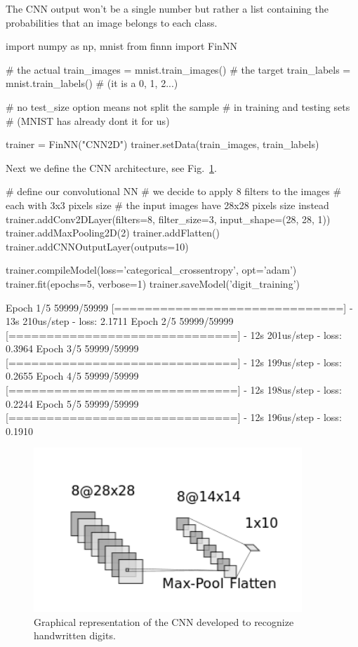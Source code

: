 The CNN output won't be a single number but rather a list containing the probabilities that an image belongs to each class.

\begin{ipython}
import numpy as np, mnist
from finnn import FinNN

# the actual
train_images = mnist.train_images()
# the target
train_labels = mnist.train_labels() # (it is a 0, 1, 2...)

# no test_size option means not split the sample
# in training and testing sets
# (MNIST has already dont it for us)

trainer = FinNN("CNN2D")
trainer.setData(train_images, train_labels)
\end{ipython}
\noindent
Next we define the CNN architecture, see Fig.~\ref{fig:cnn2d}.

\begin{ipython}
# define our convolutional NN
# we decide to apply 8 filters to the images
# each with 3x3 pixels size
# the input images have 28x28 pixels size instead
trainer.addConv2DLayer(filters=8, filter_size=3, input_shape=(28, 28, 1))
trainer.addMaxPooling2D(2)
trainer.addFlatten()
trainer.addCNNOutputLayer(outputs=10)

trainer.compileModel(loss='categorical_crossentropy', opt='adam')
trainer.fit(epochs=5, verbose=1)
trainer.saveModel('digit_training')
\end{ipython}
\begin{ioutput}
Epoch 1/5
59999/59999 [==============================] - 13s 210us/step - loss: 2.1711
Epoch 2/5
59999/59999 [==============================] - 12s 201us/step - loss: 0.3964
Epoch 3/5
59999/59999 [==============================] - 12s 199us/step - loss: 0.2655
Epoch 4/5
59999/59999 [==============================] - 12s 198us/step - loss: 0.2244
Epoch 5/5
59999/59999 [==============================] - 12s 196us/step - loss: 0.1910
\end{ioutput}

\begin{figure}[htb]
\centering
\includegraphics[width=0.9\textwidth]{figures/cnn_2d.png}
\caption{Graphical representation of the CNN developed to recognize handwritten digits.}
    \label{fig:cnn2d}
\end{figure}

